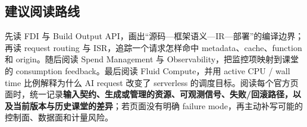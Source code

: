 \subsection{建议阅读路线}

先读 FDI 与 Build Output API，画出“源码—框架语义—IR—部署”的编译边界；再读 request routing 与 ISR，追踪一个请求怎样命中 metadata、cache、function 和 origin。随后阅读 Spend Management 与 Observability，把监控项映射到课堂的 consumption feedback。最后阅读 Fluid Compute，并用 active CPU / wall time 比例解释为什么 AI request 改变了 serverless 的调度目标。阅读每个官方页面时，统一记录\textbf{输入契约、生成或管理的资源、可观测信号、失败/回滚路径，以及当前版本与历史课堂的差异}；若页面没有明确 failure mode，再主动补写可能的控制面、数据面和计量风险。


